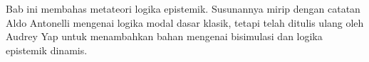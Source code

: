 \documentclass[../../../include/open-logic-chapter]{subfiles}
\begin{document}

\begin{editorial}
  Bab ini membahas metateori logika epistemik. Susunannya mirip dengan
  catatan Aldo Antonelli mengenai logika modal dasar klasik, tetapi telah
  ditulis ulang oleh Audrey Yap untuk menambahkan bahan mengenai bisimulasi
  dan logika epistemik dinamis.
\end{editorial}



\OLEndPartHook
\end{document}
